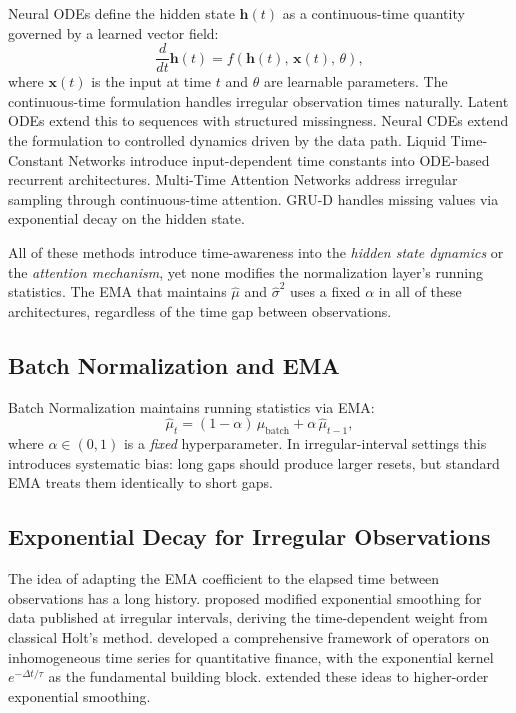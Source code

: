 \documentclass[11pt,a4paper]{article}
\newcommand{\bh}{\mathbf{h}}
\newcommand{\bx}{\mathbf{x}}
\newcommand{\ddt}{\frac{d}{dt}}
\begin{document}
Neural ODEs \citep{chen2018neural} define the hidden state $\bh(t)$ as a
continuous-time quantity governed by a learned vector field:
\begin{equation}
  \ddt \bh(t) = f\!\left(\bh(t),\, \bx(t),\, \theta\right),
  \label{eq:node}
\end{equation}
where $\bx(t)$ is the input at time $t$ and $\theta$ are learnable parameters.
The continuous-time formulation handles irregular observation times naturally.
Latent ODEs \citep{rubanova2019latent} extend this to sequences with structured
missingness. Neural CDEs \citep{kidger2020neural} extend the formulation to
controlled dynamics driven by the data path. Liquid Time-Constant Networks
\citep{hasani2021liquid} introduce input-dependent time constants into ODE-based
recurrent architectures. Multi-Time Attention Networks \citep{shukla2021multi}
address irregular sampling through continuous-time attention. GRU-D
\citep{che2018recurrent} handles missing values via exponential decay on the
hidden state.

All of these methods introduce time-awareness into the \emph{hidden
state dynamics} or the \emph{attention mechanism}, yet none modifies the
normalization layer's running statistics. The EMA that maintains
$\hat{\mu}$ and $\hat{\sigma}^2$ uses a fixed $\alpha$ in all of these
architectures, regardless of the time gap between observations.

\subsection{Batch Normalization and EMA}

Batch Normalization \citep{ioffe2015batch} maintains running statistics via EMA:
\begin{equation}
  \hat{\mu}_t = (1 - \alpha)\,\mu_\text{batch} + \alpha\,\hat{\mu}_{t-1},
\end{equation}
where $\alpha \in (0,1)$ is a \emph{fixed} hyperparameter. In irregular-interval
settings this introduces systematic bias: long gaps should produce larger resets,
but standard EMA treats them identically to short gaps.

\subsection{Exponential Decay for Irregular Observations}

The idea of adapting the EMA coefficient to the elapsed time between observations
has a long history. \citet{wright1986} proposed modified exponential smoothing for
data published at irregular intervals, deriving the time-dependent weight from
classical Holt's method. \citet{zumbach2001operators} developed a comprehensive
framework of operators on inhomogeneous time series for quantitative finance,
with the exponential kernel $e^{-\Delta t / \tau}$ as the fundamental building
block. \citet{cipra2006} extended these ideas to higher-order exponential
smoothing.
\end{document}
